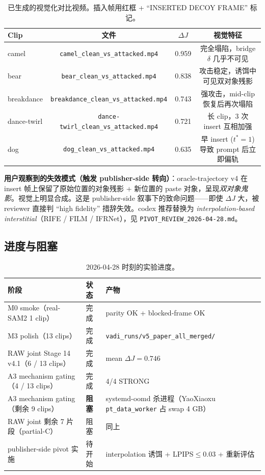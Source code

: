 \documentclass[11pt,a4paper]{ctexart}
\begin{document}
\begin{table}[h]
\centering
\small
\begin{tabular}{lccc}
\toprule
\textbf{Clip} & \textbf{文件} & \textbf{$\Delta J$} & \textbf{视觉特征} \\
\midrule
camel       & \texttt{camel\_clean\_vs\_attacked.mp4}       & 0.959 & 完全塌陷，bridge $\delta$ 几乎不可见 \\
bear        & \texttt{bear\_clean\_vs\_attacked.mp4}        & 0.838 & 攻击稳定，诱饵中可见双对象残影 \\
breakdance  & \texttt{breakdance\_clean\_vs\_attacked.mp4}  & 0.743 & 强攻击，mid-clip 恢复后再次塌陷 \\
dance-twirl & \texttt{dance-twirl\_clean\_vs\_attacked.mp4} & 0.721 & 长 clip，3 次 insert 互相加强 \\
dog         & \texttt{dog\_clean\_vs\_attacked.mp4}         & 0.635 & 早 insert ($t^*{=}1$) 导致 prompt 后立即偏轨 \\
\bottomrule
\end{tabular}
\caption{已生成的视觉化对比视频。插入帧用红框 + ``INSERTED DECOY FRAME'' 标记。}
\label{tab:viz}
\end{table}

\textbf{用户观察到的失效模式（触发 publisher-side 转向）}：oracle-trajectory v4 在 insert 帧上保留了原始位置的对象残影 + 新位置的 paste 对象，呈现\emph{双对象鬼影}。视觉上明显合成。这是 publisher-side 叙事下的致命问题——即使 $\Delta J$ 大，被 reviewer 直接判 ``high fidelity'' 措辞失效。codex 推荐替换为 \emph{interpolation-based interstitial}（RIFE / FILM / IFRNet），见 \texttt{PIVOT\_REVIEW\_2026-04-28.md}。

\subsection{进度与阻塞}

\begin{table}[h]
\centering
\small
\begin{tabular}{lll}
\toprule
\textbf{阶段} & \textbf{状态} & \textbf{产物} \\
\midrule
M0 smoke（real-SAM2 1 clip） & 完成 & parity OK + blocked-frame OK \\
M3 polish（13 clips） & 完成 & \texttt{vadi\_runs/v5\_paper\_all\_merged/} \\
RAW joint Stage 14 v4.1（6 / 13 clips） & 完成 & mean $\Delta J=0.746$ \\
A3 mechanism gating（4 / 13 clips） & 完成 & 4/4 STRONG \\
A3 mechanism gating（剩余 9 clips） & \textbf{阻塞} & systemd-oomd 杀进程（YaoXiaoxu \texttt{pt\_data\_worker} 占 swap 4 GB） \\
RAW joint 剩余 7 片段（partial-C） & 阻塞 & 同上 \\
publisher-side pivot 实施 & 待开始 & interpolation 诱饵 + LPIPS$\leq$0.03 + 重新评估 \\
\bottomrule
\end{tabular}
\caption{2026-04-28 时刻的实验进度。}
\end{table}
\end{document}
